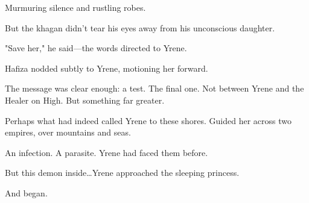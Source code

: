 Murmuring silence and rustling robes.

But the khagan didn't tear his eyes away from his unconscious daughter.

"Save her," he said---the words directed to Yrene.

Hafiza nodded subtly to Yrene, motioning her forward.

The message was clear enough: a test.
The final one.
Not between Yrene and the Healer on High.
But something far greater.

Perhaps what had indeed called Yrene to these shores.
Guided her across two empires, over mountains and seas.

An infection.
A parasite.
Yrene had faced them before.

But this demon inside\ldots Yrene approached the sleeping princess.

And began.

